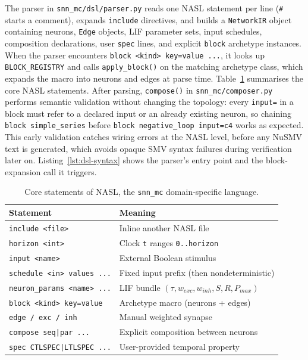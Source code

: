 \documentclass[
]{ceurart}
\begin{document}
The parser in \texttt{snn\_mc/dsl/parser.py} reads one \textsc{NASL}
statement per line (\texttt{\#} starts a comment), expands \texttt{include}
directives, and builds a \texttt{NetworkIR} object containing neurons,
\texttt{Edge} objects, LIF parameter sets, input schedules, composition
declarations, user \texttt{spec} lines, and explicit \texttt{block}
archetype instances. When the parser encounters
\texttt{block <kind> key=value ...}, it looks up \texttt{BLOCK\_REGISTRY}
and calls \texttt{apply\_block()} on the matching archetype class, which
expands the macro into neurons and edges at parse time.
Table~\ref{tab:dsl-statements} summarises the core \textsc{NASL}
statements. After parsing, \texttt{compose()} in
\texttt{snn\_mc/composer.py} performs semantic validation without changing
the topology: every \texttt{input=} in a block must refer to a declared
input or an already existing neuron, so chaining \texttt{block
simple\_series} before \texttt{block negative\_loop input=c4} works as
expected. This early validation catches wiring errors at the
\textsc{NASL} level, before any NuSMV text is generated, which avoids
opaque SMV syntax failures during verification later on.
Listing~\ref{lst:dsl-syntax} shows the parser's entry point and the
block-expansion call it triggers.

\FloatBarrier
\begin{table}[!ht]
\centering
\caption{Core statements of \textsc{NASL}, the \texttt{snn\_mc} domain-specific language.}
\label{tab:dsl-statements}
\begin{tabular}{@{}ll@{}}
\toprule
\textbf{Statement} & \textbf{Meaning} \\
\midrule
\texttt{include <file>} & Inline another \textsc{NASL} file \\
\texttt{horizon <int>} & Clock \texttt{t} ranges \texttt{0..horizon} \\
\texttt{input <name>} & External Boolean stimulus \\
\texttt{schedule <in> values ...} & Fixed input prefix (then nondeterministic) \\
\texttt{neuron\_params <name> ...} & LIF bundle $(\tau, w_{exc}, w_{inh}, S, R, P_{max})$ \\
\texttt{block <kind> key=value} & Archetype macro (neurons + edges) \\
\texttt{edge / exc / inh} & Manual weighted synapse \\
\texttt{compose seq|par ...} & Explicit composition between neurons \\
\texttt{spec CTLSPEC|LTLSPEC ...} & User-provided temporal property \\
\bottomrule
\end{tabular}
\end{table}
\end{document}
